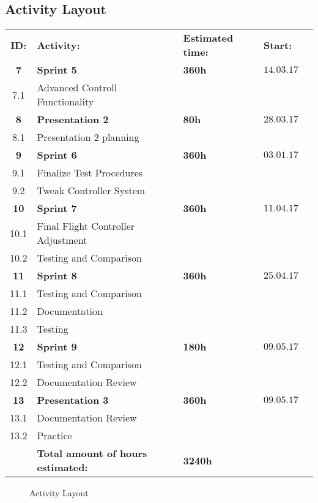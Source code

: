\begin{center}
\section*{\textbf{Activity Layout}}
\begin{tabular}{cllll}
\rowcolor{cadetgrey}
\textbf{ID:}    &\textbf{Activity:} 	 &\textbf{Estimated time:}    &\textbf{Start:}  \\ %
\rowcolor{gainsboro}
\textbf{7} & \textbf{Sprint 5}     & \textbf{360h}     & $14.03.17$ \\
7.1     & Advanced Controll Functionality &  & \\\rowcolor{gainsboro}
\textbf{8} & \textbf{Presentation 2}     & \textbf{80h}     & $28.03.17$ \\
8.1     & Presentation 2 planning &  &  \\\rowcolor{gainsboro}
\textbf{9} & \textbf{Sprint 6}     & \textbf{360h}     & $03.01.17$ \\
9.1     & Finalize Test Procedures &  & 
\\\rowcolor{gainsboro}
9.2     & Tweak Controller System &  & \\
\textbf{10} & \textbf{Sprint 7}     & \textbf{360h}     & $11.04.17$ \\
\rowcolor{gainsboro}
10.1     & Final Flight Controller Adjustment &  & \\
10.2     & Testing and Comparison & & \\
\rowcolor{gainsboro}
\textbf{11} & \textbf{Sprint 8}     & \textbf{360h}    & $25.04.17$ \\
11.1     & Testing and Comparison              &  &  \\\rowcolor{gainsboro}
11.2     & Documentation &  &  \\
11.3     & Testing & &  \\ 
\rowcolor{gainsboro}
\textbf{12} & \textbf{Sprint 9}     & \textbf{180h}     & $09.05.17$ \\
12.1     & Testing and Comparison &  &  \\\rowcolor{gainsboro}
12.2     & Documentation Review &  & \\
\textbf{13} & \textbf{Presentation 3}     & \textbf{360h}     & $09.05.17$ \\
\rowcolor{gainsboro}
13.1     & Documentation Review &  & \\
13.2     & Practice & & \\
\rowcolor{gainsboro}
         & \textbf{Total amount of hours estimated:} & \textbf{3240h} & 
\end{tabular}                                                               
\end{center}
\begin{figure}[h]
        \centering
          \centering
            \caption{Activity Layout}
            \label{list}
\end{figure}